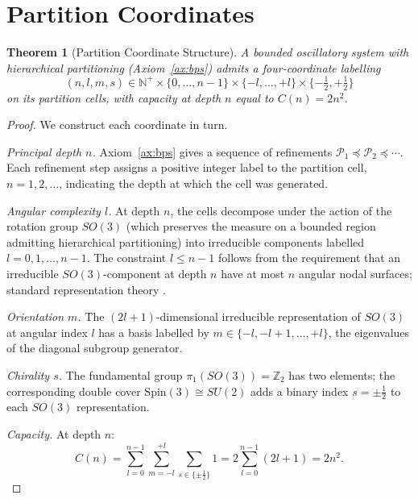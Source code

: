 \documentclass[twocolumn,11pt,a4paper]{article}
\theoremstyle{thmstyle}
\newtheorem{theorem}{Theorem}[section]
\theoremstyle{axiomstyle}
\theoremstyle{definition}
\theoremstyle{remark}
\newcommand{\Natural}{\mathbb{N}}
\newcommand{\Integer}{\mathbb{Z}}
\newcommand{\Pspace}{\mathcal{P}}
\begin{document}
\section{Partition Coordinates}
\label{sec:partitioncoords}

\begin{theorem}[Partition Coordinate Structure]\label{thm:partitioncoords}
A bounded oscillatory system with hierarchical partitioning (Axiom~\ref{ax:bps}) admits a four-coordinate labelling
\begin{equation}
(n,l,m,s)\in\Natural^{+}\times\{0,\ldots,n-1\}\times\{-l,\ldots,+l\}\times\{-\tfrac{1}{2},+\tfrac{1}{2}\}
\end{equation}
on its partition cells, with capacity at depth $n$ equal to $C(n)=2n^{2}$.
\end{theorem}

\begin{proof}
We construct each coordinate in turn.

\emph{Principal depth $n$.} Axiom~\ref{ax:bps} gives a sequence of refinements $\Pspace_{1}\preceq\Pspace_{2}\preceq\cdots$. Each refinement step assigns a positive integer label to the partition cell, $n=1,2,\ldots$, indicating the depth at which the cell was generated.

\emph{Angular complexity $l$.} At depth $n$, the cells decompose under the action of the rotation group $SO(3)$ (which preserves the measure on a bounded region admitting hierarchical partitioning) into irreducible components labelled $l=0,1,\ldots,n-1$. The constraint $l\leq n-1$ follows from the requirement that an irreducible $SO(3)$-component at depth $n$ have at most $n$ angular nodal surfaces; standard representation theory \citep{wigner1959,naimark1964}.

\emph{Orientation $m$.} The $(2l+1)$-dimensional irreducible representation of $SO(3)$ at angular index $l$ has a basis labelled by $m\in\{-l,-l+1,\ldots,+l\}$, the eigenvalues of the diagonal subgroup generator.

\emph{Chirality $s$.} The fundamental group $\pi_{1}(SO(3))=\Integer_{2}$ has two elements; the corresponding double cover $\mathrm{Spin}(3)\cong SU(2)$ adds a binary index $s=\pm\tfrac{1}{2}$ to each $SO(3)$ representation.

\emph{Capacity.} At depth $n$:
\begin{equation}
C(n)=\sum_{l=0}^{n-1}\sum_{m=-l}^{+l}\sum_{s\in\{\pm\tfrac{1}{2}\}}1=2\sum_{l=0}^{n-1}(2l+1)=2n^{2}.
\end{equation}
\end{proof}
\end{document}
